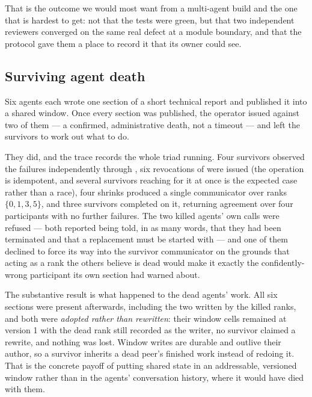 That is the outcome we would most want from a multi-agent build and the one
that is hardest to get: not that the tests were green, but that two independent
reviewers converged on the same real defect at a module boundary, and that the
protocol gave them a place to record it that its owner could see.

\subsection{Surviving agent death}
\label{sec:eval-fault}

Six agents each wrote one section of a short technical report and published it
into a shared window.  Once every section was published, the operator issued
 against two of them --- a confirmed, administrative death, not
a timeout --- and left the survivors to work out what to do.

They did, and the trace records the whole triad running.  Four survivors
observed the failures independently through , six
revocations of  were issued (the operation is idempotent, and
several survivors reaching for it at once is the expected case rather than a
race), four shrinks produced a single communicator  over ranks
$\{0, 1, 3, 5\}$, and three survivors completed  on it,
returning agreement over four participants with no further failures.  The two
killed agents' own calls were refused --- both reported being told, in as many
words, that they had been terminated and that a replacement must be started
with  --- and one of them declined to force its way into the
survivor communicator on the grounds that acting as a rank the others believe
is dead would make it exactly the confidently-wrong participant its own section
had warned about.

The substantive result is what happened to the dead agents' work.  All six
sections were present afterwards, including the two written by the killed
ranks, and both were \emph{adopted rather than rewritten}: their window cells
remained at version 1 with the dead rank still recorded as the writer, no
survivor claimed a rewrite, and nothing was lost.  Window writes are durable
and outlive their author, so a survivor inherits a dead peer's finished work
instead of redoing it.  That is the concrete payoff of putting shared state in
an addressable, versioned window rather than in the agents' conversation
history, where it would have died with them.

